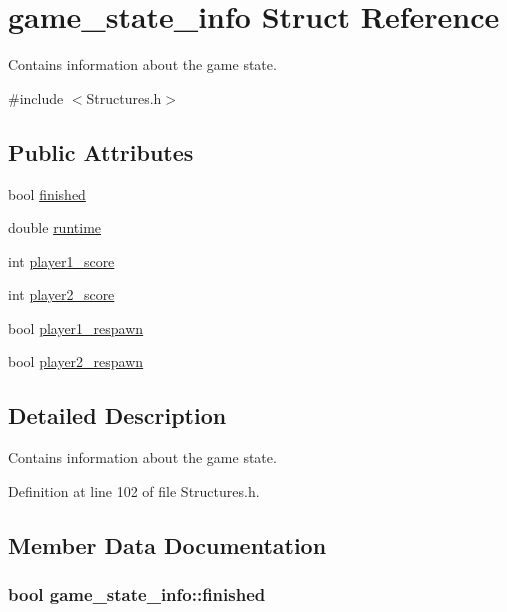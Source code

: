 \hypertarget{structgame__state__info}{\section{game\-\_\-state\-\_\-info Struct Reference}
\label{structgame__state__info}
}


Contains information about the game state.  




{\ttfamily \#include $<$Structures.\-h$>$}

\subsection*{Public Attributes}
\begin{DoxyCompactItemize}
\item 
bool \hyperlink{structgame__state__info_a5b4e6baa76c6df97aeffc8621baec2d4}{finished}
\item 
double \hyperlink{structgame__state__info_ac601ae590859dff59da88a221761a1f2}{runtime}
\item 
int \hyperlink{structgame__state__info_ad1d0950a104fa3def5a1f259a3c0914c}{player1\-\_\-score}
\item 
int \hyperlink{structgame__state__info_a16292b25dcb66803f6eeecf8779c5edd}{player2\-\_\-score}
\item 
bool \hyperlink{structgame__state__info_a6ece578c6ce78f5f2d71b55f1678bb22}{player1\-\_\-respawn}
\item 
bool \hyperlink{structgame__state__info_ac2783a12bd611e0873284e0c4dd5fcf4}{player2\-\_\-respawn}
\end{DoxyCompactItemize}


\subsection{Detailed Description}
Contains information about the game state. 

Definition at line 102 of file Structures.\-h.



\subsection{Member Data Documentation}
\hypertarget{structgame__state__info_a5b4e6baa76c6df97aeffc8621baec2d4}{
\subsubsection[{finished}]{\setlength{\rightskip}{0pt plus 5cm}bool game\-\_\-state\-\_\-info\-::finished}}\label{structgame__state__info_a5b4e6baa76c6df97aeffc8621baec2d4}


